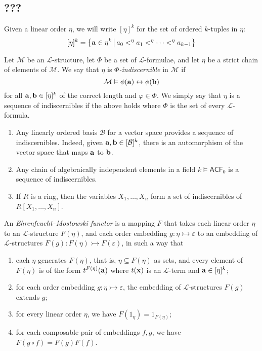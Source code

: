 \subsection{???}
Given a linear order \( \eta \), we will write \( [\eta]^k \) for the set of ordered \( k \)-tuples in \( \eta \):
\[ [\eta]^k = \qty{\vb a \in \eta^k \,\middle|\,a_0 <^\eta a_1 <^\eta \dots <^\eta a_{k-1}} \]
\begin{definition}
	Let \( \mathcal M \) be an \( \mathcal L \)-structure, let \( \Phi \) be a set of \( \mathcal L \)-formulae, and let \( \eta \) be a strict chain of elements of \( \mathcal M \).
	We say that \( \eta \) is \emph{\( \Phi \)-indiscernible} in \( \mathcal M \) if
	\[ \mathcal M \vDash \phi(\vb a) \leftrightarrow \phi(\vb b) \]
	for all \( \vb a, \vb b \in [\eta]^k \) of the correct length and \( \varphi \in \Phi \).
	We simply say that \( \eta \) is a sequence of indiscernibles if the above holds where \( \Phi \) is the set of every \( \mathcal L \)-formula.
\end{definition}
\begin{example}
	\begin{enumerate}
		\item Any linearly ordered basis \( \mathcal B \) for a vector space provides a sequence of indiscernibles.
			Indeed, given \( \vb a, \vb b \in [\mathcal B]^k \), there is an automorphism of the vector space that maps \( \vb a \) to \( \vb b \).
		\item Any chain of algebraically independent elements in a field \( k \vDash \mathsf{ACF}_0 \) is a sequence of indiscernibles.
		\item If \( R \) is a ring, then the variables \( X_1, \dots, X_n \) form a set of indiscernibles of \( R[X_1, \dots, X_n] \).
	\end{enumerate}
\end{example}
\begin{definition}
	An \emph{Ehrenfeucht--Mostowski functor} is a mapping \( F \) that takes each linear order \( \eta \) to an \( \mathcal L \)-structure \( F(\eta) \), and each order embedding \( g : \eta \rightarrowtail \varepsilon \) to an embedding of \( \mathcal L \)-structures \( F(g) : F(\eta) \rightarrowtail F(\varepsilon) \), in such a way that
	\begin{enumerate}
		\item each \( \eta \) generates \( F(\eta) \), that is, \( \eta \subseteq F(\eta) \) as sets, and every element of \( F(\eta) \) is of the form \( t^{F(\eta)}(\vb a) \) where \( t(\vb x) \) is an \( \mathcal L \)-term and \( \vb a \in [\eta]^k \);
		\item for each order embedding \( g : \eta \rightarrowtail \varepsilon \), the embedding of \( \mathcal L \)-structures \( F(g) \) extends \( g \);
		\item for every linear order \( \eta \), we have \( F(1_\eta) = 1_{F(\eta)} \);
		\item for each composable pair of embeddings \( f, g \), we have \( F(g\circ f) = F(g)F(f) \).
	\end{enumerate}
\end{definition}
